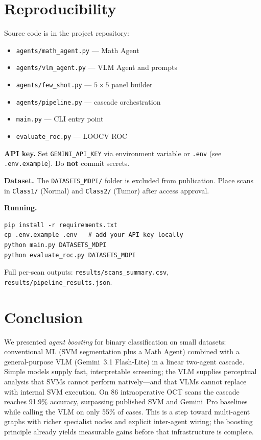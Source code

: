 \documentclass[11pt]{article}
\begin{document}
\section{Reproducibility}

Source code is in the project repository:
\begin{itemize}[nosep]
  \item \texttt{agents/math\_agent.py} --- Math Agent
  \item \texttt{agents/vlm\_agent.py} --- VLM Agent and prompts
  \item \texttt{agents/few\_shot.py} --- $5\times5$ panel builder
  \item \texttt{agents/pipeline.py} --- cascade orchestration
  \item \texttt{main.py} --- CLI entry point
  \item \texttt{evaluate\_roc.py} --- LOOCV ROC
\end{itemize}

\textbf{API key.}
Set \texttt{GEMINI\_API\_KEY} via environment variable or \texttt{.env} (see \texttt{.env.example}).
Do \textbf{not} commit secrets.

\textbf{Dataset.}
The \texttt{DATASETS\_MDPI/} folder is excluded from publication.
Place scans in \texttt{Class1/} (Normal) and \texttt{Class2/} (Tumor) after access approval.

\textbf{Running.}
\begin{lstlisting}[style=prompt]
pip install -r requirements.txt
cp .env.example .env   # add your API key locally
python main.py DATASETS_MDPI
python evaluate_roc.py DATASETS_MDPI
\end{lstlisting}

Full per-scan outputs: \texttt{results/scans\_summary.csv}, \texttt{results/pipeline\_results.json}.

\section{Conclusion}

We presented \emph{agent boosting} for binary classification on small datasets: conventional ML (SVM segmentation plus a Math Agent) combined with a general-purpose VLM (Gemini~3.1 Flash-Lite) in a linear two-agent cascade.
Simple models supply fast, interpretable screening; the VLM supplies perceptual analysis that SVMs cannot perform natively---and that VLMs cannot replace with internal SVM execution.
On 86 intraoperative OCT scans the cascade reaches 91.9\% accuracy, surpassing published SVM and Gemini~Pro baselines while calling the VLM on only 55\% of cases.
This is a step toward multi-agent graphs with richer specialist nodes and explicit inter-agent wiring; the boosting principle already yields measurable gains before that infrastructure is complete.
\end{document}
